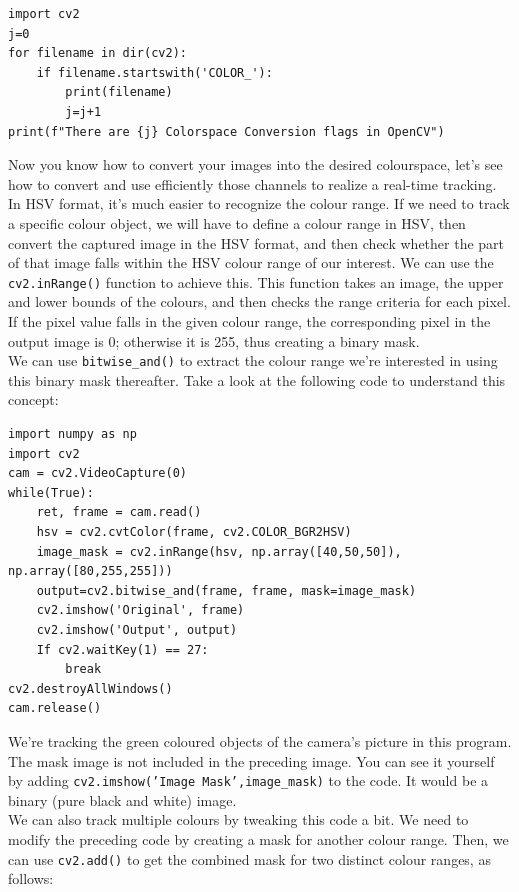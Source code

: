 \documentclass{labo}
\begin{document}
\begin{verbatim}
import cv2
j=0
for filename in dir(cv2):
	if filename.startswith('COLOR_'):
		print(filename)
		j=j+1
print(f"There are {j} Colorspace Conversion flags in OpenCV")
\end{verbatim}

Now you know how to convert your images into the desired colourspace, let’s see how to
convert and use efficiently those channels to realize a real-time tracking.\\

In HSV format, it's much easier to recognize the colour range. If we need to track a specific
colour object, we will have to define a colour range in HSV, then convert the captured image in the HSV
format, and then check whether the part of that image falls within the HSV colour range of our
interest. We can use the \texttt{cv2.inRange()} function to achieve this. This function takes an image, the upper and lower bounds of the colours, and then checks the range criteria for each pixel. If the pixel
value falls in the given colour range, the corresponding pixel in the output image is 0; otherwise it is
255, thus creating a binary mask.\\

We can use \texttt{bitwise\_and()} to extract the colour range we're interested in using this binary mask thereafter. Take a look at the following code to understand this concept:

\begin{verbatim}
import numpy as np
import cv2
cam = cv2.VideoCapture(0)
while(True):
	ret, frame = cam.read()
	hsv = cv2.cvtColor(frame, cv2.COLOR_BGR2HSV)
	image_mask = cv2.inRange(hsv, np.array([40,50,50]), np.array([80,255,255]))
	output=cv2.bitwise_and(frame, frame, mask=image_mask)
	cv2.imshow('Original', frame)
	cv2.imshow('Output', output)
	If cv2.waitKey(1) == 27:
		break
cv2.destroyAllWindows()
cam.release()
\end{verbatim}

We're tracking the {\color{green}green} coloured objects of the camera’s picture in this program.\\

The mask image is not included in the preceding image. You can see it yourself by adding
\texttt{cv2.imshow('Image Mask',image\_mask)} to the code. It would be a binary (pure black and white) image.\\

We can also track multiple colours by tweaking this code a bit. We need to modify the
preceding code by creating a mask for another colour range. Then, we can use \texttt{cv2.add()} to get the combined mask for two distinct colour ranges, as follows:
\end{document}
